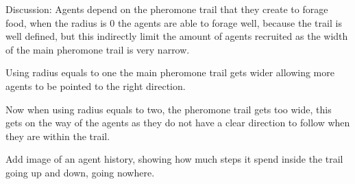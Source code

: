 Discussion: Agents depend on the pheromone trail that they create to forage food, when the radius is 0 the agents are able to forage well, because the trail is well defined, but this indirectly limit the amount of agents recruited as the width of the main pheromone trail is very narrow. 

Using radius equals to one the main pheromone trail gets wider allowing more agents to be pointed to the right direction.

Now when using radius equals to two, the pheromone trail gets too wide, this gets on the way of the agents as they do not have a clear direction to follow when they are within the trail. 

Add image of an agent history, showing how much steps it spend inside the trail going up and down, going nowhere.